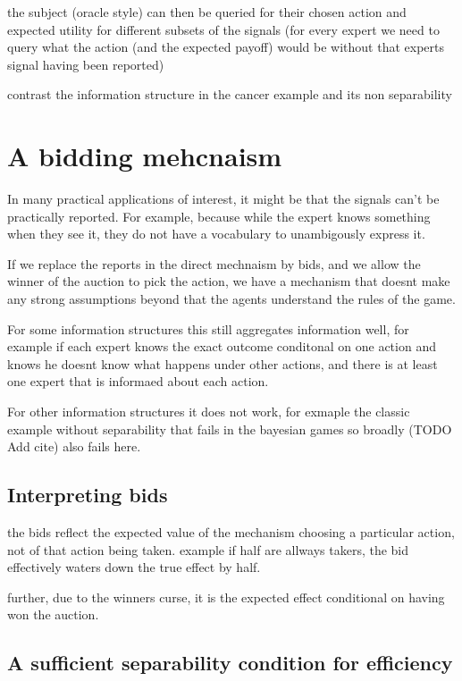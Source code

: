 the subject (oracle style) can then be queried for their chosen action and expected utility for different subsets of the signals (for every expert we need to query what the action (and the expected payoff) would be without that experts signal having been reported)

contrast the information structure in the cancer example and its non separability 


\section{A bidding mehcnaism }

In many practical applications of interest, it might be that the signals can't be practically reported. For example, because while the expert knows something when they see it, they do not have a vocabulary to unambigously express it. 


If we replace the reports in the direct mechnaism by bids, and we allow the winner of the auction to pick the action, we have a mechanism that doesnt make any strong assumptions beyond that the agents understand the rules of the game.

For some information structures this still aggregates information well, for example if each expert knows the exact outcome conditonal on one action and knows he doesnt know what happens under other actions, and there is at least one expert that is informaed about each action.

For other information structures it does not work, for exmaple the classic example without separability that fails in the bayesian games so broadly (TODO Add cite) also fails here. 

\subsection{Interpreting bids}

the bids reflect the expected value of the mechanism choosing a particular action, not of that action being taken. example if half are allways takers, the bid effectively waters down the true effect by half.

further, due to the winners curse, it is the expected effect conditional on having won the auction. 

\subsection{A sufficient separability condition for efficiency}

